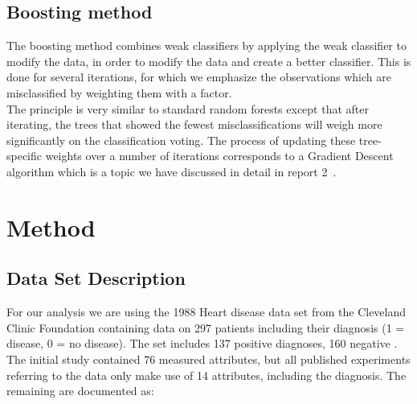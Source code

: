 \documentclass[reprint,english,notitlepage]{revtex4-1}  %
\begin{document}
\subsection{Boosting method}
The boosting method combines weak classifiers by applying the weak classifier to modify the data, in order to modify the data and create a better classifier. This is done for several iterations, for which we emphasize the observations which are misclassified by weighting them with a factor. 
\vspace{3mm}
\\ 
The principle is very similar to standard random forests except that after iterating, the trees that showed the fewest misclassifications will weigh more significantly on the classification voting. The process of updating these tree-specific weights over a number of iterations corresponds to a Gradient Descent algorithm which is a topic we have discussed in detail in report 2~\cite{proj2}.

\section{Method}\label{sec: method}

\subsection{Data Set Description}

For our analysis we are using the 1988 Heart disease data set from the Cleveland Clinic Foundation containing data on 297 patients including their diagnosis (1 = disease, 0 = no disease). The set includes 137 positive diagnoses, 160 negative \cite{heart}.
\vspace{3mm}
\\ 
The initial study contained 76 measured attributes, but all published experiments referring to the data only make use of 14 attributes, including the diagnosis. The remaining are documented as:
\end{document}
